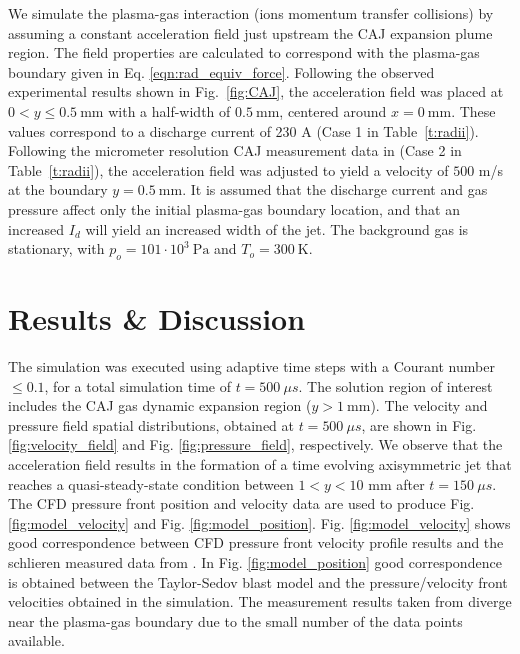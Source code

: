 \documentclass[a4paper]{iacas}%
\begin{document}
We simulate the plasma-gas interaction (ions momentum transfer collisions) by assuming a constant acceleration field just upstream the CAJ expansion plume region. The field properties are calculated to correspond with the plasma-gas boundary given in Eq. \eqref{eqn:rad_equiv_force}. Following the observed experimental results shown in Fig.~\ref{fig:CAJ}, the acceleration field was placed at $0  < y \leq 0.5~ \mathrm{mm} $ with a half-width of $0.5~\mathrm{mm}$, centered around $x=0~\mathrm{mm}$. These values correspond to a discharge current of 230 A (Case 1 in Table~\ref{t:radii}).
Following the micrometer resolution CAJ measurement data in \cite{KRClose} (Case 2 in Table~\ref{t:radii}), the acceleration field was adjusted to yield a velocity of $500$ m/s at the boundary $y = 0.5~\mathrm{mm}$. It is assumed that the discharge current and gas pressure affect only the initial plasma-gas boundary location, and that an increased $I_d$ will yield an increased width of the jet. The background gas is stationary, with $p_o = 101\cdot 10^3~\mathrm{Pa}$ and $T_o = 300~\mathrm{K}$.

\section{Results \& Discussion}

The simulation was executed using adaptive time steps with a Courant number $\leq 0.1$, for a total simulation time of $t = 500~\mu s$. The solution region of interest includes the CAJ gas dynamic expansion region ($ y > 1~\mathrm{mm} $). The velocity and pressure field spatial distributions, obtained at $ t = 500~\mu s $, are shown in Fig. \ref{fig:velocity_field} and Fig. \ref{fig:pressure_field}, respectively. We observe that the acceleration field results in the formation of a time evolving axisymmetric jet that reaches a quasi-steady-state condition between $1 < y < 10$ mm after $t = 150~\mu s$.
The CFD pressure front position and velocity data are used to produce Fig. \ref{fig:model_velocity} and Fig. \ref{fig:model_position}. Fig. \ref{fig:model_velocity} shows good correspondence between CFD pressure front velocity profile results and the schlieren measured data from \cite{KR}. In Fig. \ref{fig:model_position} good correspondence is obtained between the Taylor-Sedov blast model and the pressure/velocity front velocities obtained in the simulation. The measurement results taken from \cite{KR} diverge near the plasma-gas boundary due to the small number of the data points available.
\end{document}
